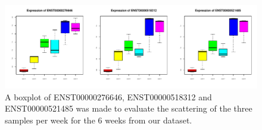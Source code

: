 \documentclass[
]{article}
\begin{document}
\begin{figure}
\centering
\includegraphics{final_report_files/figure-latex/Cerebellar-Hemisphere-specific-1.pdf}
\caption{\label{fig:Cerebellar-Hemisphere-specific}A boxplot of ENST00000276646, ENST00000518312 and ENST00000521485 was made to evaluate the scattering of the three samples per week for the 6 weeks from our dataset.}
\end{figure}
\end{document}
